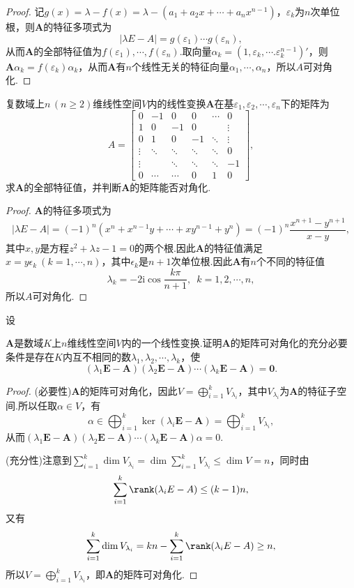 \begin{proof}
	记$g(x)=\lambda-f(x)=\lambda-(a_1+a_2x+\cdots+a_nx^{n-1})$，$\varepsilon_k$为$n$次单位根，则$\bm A$的特征多项式为
	\[
		|\lambda E-A|=g(\varepsilon_1)\cdots g(\varepsilon_n),
	\]
	从而$\bm A$的全部特征值为$f(\varepsilon_1),\cdots,f(\varepsilon_n)$.取向量$\alpha_k=(1,\varepsilon_k,\cdots.\varepsilon_k^{n-1})'$，则$\bm A\alpha_k=f(\varepsilon_k)\alpha_k$，从而$\bm A$有$n$个线性无关的特征向量$\alpha_1,\cdots,\alpha_n$，所以$A$可对角化.
\end{proof}
\begin{prob}[12]
	复数域上$n\,(n\ge 2)$维线性空间$V$内的线性变换$\bm A$在基$\varepsilon_1,\varepsilon_2,\cdots,\varepsilon_n$下的矩阵为
	\[
		A=\begin{bmatrix}
			0      & -1     & 0      & 0      & \cdots & 0      \\
			1      & 0      & -1     & 0      &        & \vdots \\
			0      & 1      & 0      & -1     & \ddots & \vdots \\
			\vdots & \ddots & \ddots & \ddots & \ddots & 0      \\
			\vdots &        & \ddots & \ddots & \ddots & -1     \\
			0      & \cdots & \cdots & 0      & 1      & 0
		\end{bmatrix},
	\]
	求$\bm A$的全部特征值，并判断$\bm A$的矩阵能否对角化.
\end{prob}
\begin{proof}
	$\bm A$的特征多项式为
	\[
		|\lambda E-A|=(-1)^n(x^n+x^{n-1}y+\cdots+xy^{n-1}+y^n)=(-1)^n\frac{x^{n+1}-y^{n+1}}{x-y},
	\]
	其中$x,y$是方程$z^2+\lambda z-1=0$的两个根.因此$\bm A$的特征值满足$x=y\epsilon_k\ (k=1,\cdots,n)$，其中$\epsilon_k$是$n+1$次单位根.因此$\bm A$有$n$个不同的特征值
	\[
		\lambda_k=-2\mathrm{i}\cos\frac{k\pi}{n+1},\enspace k=1,2,\cdots,n,
	\]
	所以$A$可对角化.
\end{proof}
\begin{prob}[14]
	\hypertarget{ConditionOfDiagonalized}{设}$\bm A$是数域$K$上$n$维线性空间$V$内的一个线性变换.证明$\bm A$的矩阵可对角化的充分必要条件是存在$K$内互不相同的数$\lambda_1,\lambda_2,\cdots,\lambda_k$，使
	\[
		(\lambda_1\bm E-\bm A)(\lambda_2\bm E-\bm A)\cdots(\lambda_k\bm E-\bm A)=\bm 0.
	\]
\end{prob}
\begin{proof}
	(必要性)$\bm A$的矩阵可对角化，因此$V=\displaystyle\bigoplus_{i=1}^kV_{\lambda_i}$，其中$V_{\lambda_i}$为$\bm A$的特征子空间.所以任取$\alpha\in V$，有
	\[
		\alpha\in\bigoplus_{i=1}^k\ker(\lambda_i\bm E-\bm A)=\bigoplus_{i=1}^kV_{\lambda_i},
	\]
	从而$(\lambda_1\bm E-\bm A)(\lambda_2\bm E-\bm A)\cdots(\lambda_k\bm E-\bm A)\alpha=0$.

	(充分性)注意到$\displaystyle\sum_{i=1}^k\dim V_{\lambda_i}=\dim\sum_{i=1}^{k}V_{\lambda_i}\le\dim V=n$，同时由
	\[
		\sum_{i=1}^{k}\rank(\lambda_iE-A)\le (k-1)n,
	\]
	又有
	\[
		\displaystyle\sum_{i=1}^k\dim V_{\lambda_i}=kn-\sum_{i=1}^{k}\rank(\lambda_iE-A)\ge n,
	\]
	所以$V=\displaystyle\bigoplus_{i=1}^kV_{\lambda_i}$，即$\bm A$的矩阵可对角化.
\end{proof}
